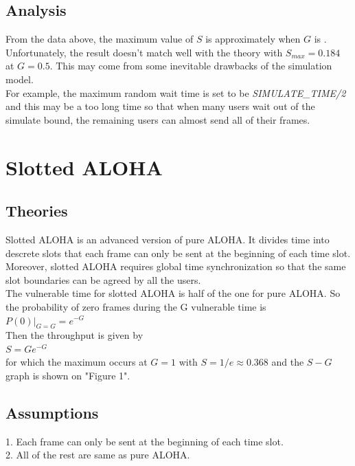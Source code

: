 \documentclass[11pt,a4paper]{report}
\begin{document}
\subsection*{Analysis}
From the data above, the maximum value of \(S\) is approximately    when \(G\) is . Unfortunately, the result doesn't match well with the theory with \(S_{max} = 0.184\) at \(G = 0.5\). This may come from some inevitable drawbacks of the simulation model. \\

For example, the maximum random wait time is set to be \emph{SIMULATE\_TIME/2} and this may be a too long time so that when many users wait out of the simulate bound, the remaining users can almost send all of their frames. \\


\section*{Slotted ALOHA}
\subsection*{Theories}
Slotted ALOHA is an advanced version of pure ALOHA. It divides time into descrete slots that each frame can only be sent at the beginning of each time slot. Moreover, slotted ALOHA requires global time synchronization so that the same slot boundaries can be agreed by all the users. \\

The vulnerable time for slotted ALOHA is half of the one for pure ALOHA. So the probability of zero frames during the G vulnerable time is \\

\qquad \(P(0)|_{G=G} = e^{-G}\) \\

Then the throughput is given by \\

\qquad \(S = Ge^{-G}\) \\

for which the maximum occurs at \(G = 1\) with \(S = 1/e \approx 0.368\) and the \(S - G\) graph is shown on "Figure 1".

\subsection*{Assumptions}
1. Each frame can only be sent at the beginning of each time slot. \\
2. All of the rest are same as pure ALOHA.
\end{document}
